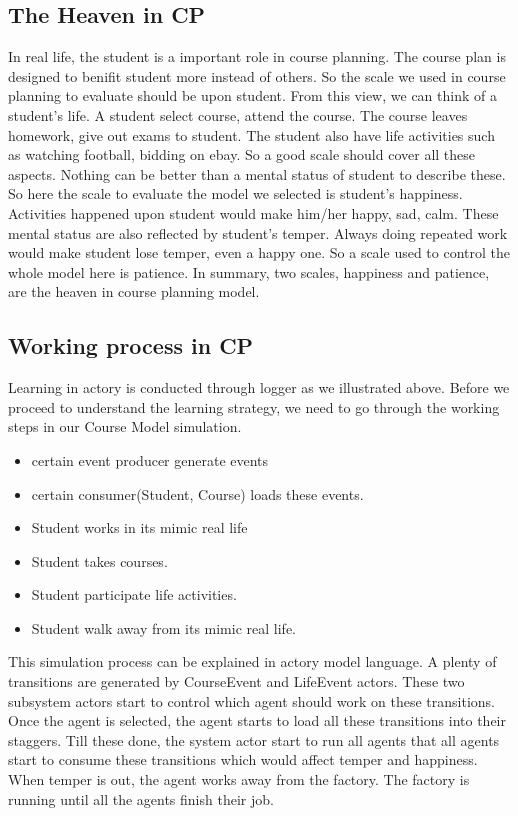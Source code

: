 \documentclass{sig-alternate}
\begin{document}
\subsection {The Heaven in CP}
In real life, the student is a important role in course planning. The course plan is designed to benifit student more instead of others.  So the scale we used in course planning to evaluate should be upon student. From this view, we can think of a student's life.  A student select course, attend the course.  The course leaves homework, give out exams to student.  The student also have life activities such as watching football,  bidding on ebay.  So a good scale should cover all these aspects.  Nothing can be better than a mental status of student to describe these. So here the scale to evaluate the model we selected is student's happiness.   Activities happened upon student would make him/her happy, sad, calm.  These mental status are also reflected by student's temper. Always doing repeated work would make student lose temper, even a happy one.  So a scale used to control the whole model here is patience. In summary,  two scales, happiness and patience, are the heaven in course planning model. 

\subsection {Working process in CP}
Learning in actory is conducted through logger as we illustrated above.  Before we proceed to understand the learning strategy, we need to go through the working steps in our Course Model simulation. 

\begin{itemize}
\item certain event producer generate events 
\item certain consumer(Student, Course) loads these events.
\item Student works in its mimic real life
\item Student takes courses.  
\item Student participate life activities.
\item Student walk away from its mimic real life. 
\end{itemize}

This simulation process can be explained in actory model language.  A plenty of transitions are generated by CourseEvent and LifeEvent actors. These two subsystem actors start to control which agent should work on these transitions.  Once the agent is selected, the agent starts to load all these transitions into their staggers.  Till these done,  the system actor start to run all agents that all agents start to consume these transitions which would affect temper and happiness. When temper is out, the agent works away from the factory.  The factory is running until all the agents finish their job. 
\end{document}

